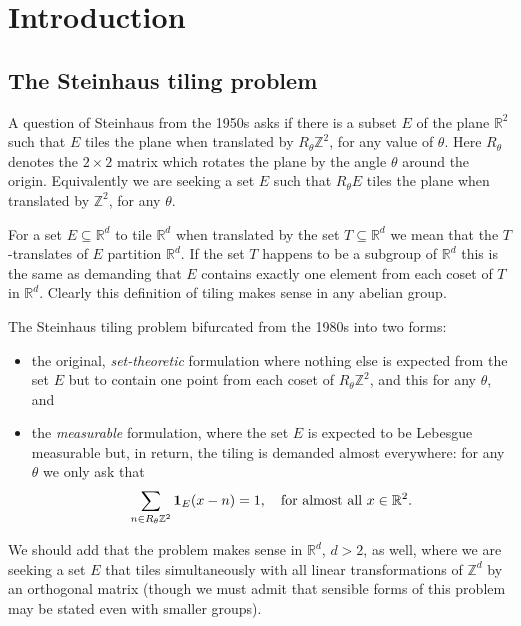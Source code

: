 \documentclass[12pt,a4paper,oneside]{amsart}
\theoremstyle{plain}
\theoremstyle{definition}
\newcommand{\one}{{\bf 1}}
\newcommand{\RR}{{\mathbb R}}
\newcommand{\ZZ}{{\mathbb Z}}
\begin{document}
\section{Introduction}\label{s:intro}

\subsection{The Steinhaus tiling problem}\label{ss:steinhaus}

A question of Steinhaus from the 1950s \cite{moser1981research,sierpinski1958probleme} asks if there is a subset $E$ of the plane $\RR^2$ such that $E$ tiles the plane when translated by $R_\theta\ZZ^2$, for any value of $\theta$. Here $R_\theta$ denotes the $2\times 2$ matrix which rotates the plane by the angle $\theta$ around the origin. Equivalently we are seeking a set $E$ such that $R_\theta {E}$ tiles the plane when translated by $\ZZ^2$, for any $\theta$.

For a set $E\subseteq\RR^d$ to tile $\RR^d$ when translated by the set $T \subseteq \RR^d$ we mean that the $T$-translates of $E$ partition $\RR^d$. If the set $T$ happens to be a subgroup of $\RR^d$ this is the same as demanding that $E$ contains exactly one element from each coset of $T$ in $\RR^d$. Clearly this definition of tiling makes sense in any abelian group.

The Steinhaus tiling problem bifurcated from the 1980s into two forms:
\begin{itemize}
\item the original, \textit{set-theoretic} formulation where nothing else is expected from the set $E$ but to contain one point from each coset of $R_\theta\ZZ^2$, and this for any $\theta$, and
\item the \textit{measurable} formulation, where the set $E$ is expected to be Lebesgue measurable but, in return, the tiling is demanded {almost} everywhere: for any $\theta$ we only ask that
\begin{equation}\label{tiling-meas}
\sum_{n \in R_\theta\ZZ^2} \one_E(x-n) = 1,\ \ \text{ for almost all } x \in \RR^2.
\end{equation}
\end{itemize}
{We} should add that the problem makes sense in $\RR^d$, $d>2$, as well, where we are seeking a {set} $E$ that tiles simultaneously with all linear transformations of $\ZZ^d$ by an orthogonal matrix (though we must admit that sensible forms of this problem may be stated even with smaller groups). 
\end{document}

